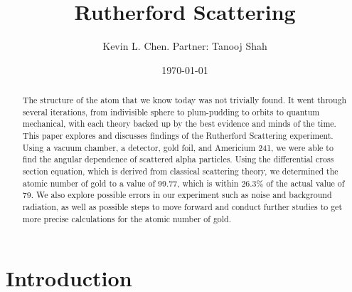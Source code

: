 \title{Rutherford Scattering}
\author         {Kevin L. Chen. Partner: Tanooj Shah}
\date{\today}

\begin{abstract}
The structure of the atom that we know today was not trivially found. It went through several iterations, from indivisible sphere to plum-pudding to orbits to quantum mechanical, with each theory backed up by the best evidence and minds of the time. This paper explores and discusses findings of the Rutherford Scattering experiment. Using a vacuum chamber, a detector, gold foil, and Americium 241, we were able to find the angular dependence of scattered alpha particles. Using the differential cross section equation, which is derived from classical scattering theory, we determined the atomic number of gold to a value of 99.77, which is within 26.3$\%$ of the actual value of 79. We also explore possible errors in our experiment such as noise and background radiation, as well as possible steps to move forward and conduct further studies to get more precise calculations for the atomic number of gold. 
\end{abstract}

\maketitle

\section{Introduction}


